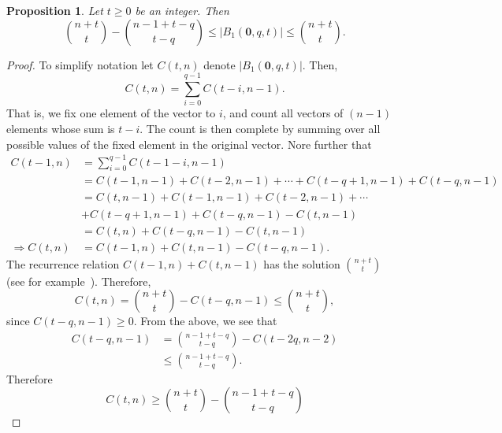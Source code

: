 \documentclass[pdflatex,sn-mathphys-num]{sn-jnl}
\newtheorem{proposition}{Proposition}
\theoremstyle{definition}
\newcommand{\vtr}[1]{\mathbf{#1}}
\begin{document}
\begin{proposition}
\label{prop:ball-cardinality}
Let $t \geq 0$ be an integer. Then
 \[
\binom{n + t}{t} - \binom{n -1 + t - q}{t-q} \leq |B_1(\vtr{0}, q, t)| \leq \binom{n + t}{t}.
 \]
\end{proposition}
\begin{proof}
To simplify notation let $C(t, n)$ denote $|B_1(\vtr{0}, q, t)|$. Then,
\[
C(t, n) = \sum_{i = 0}^{q-1} C(t - i, n - 1).
\]
That is, we fix one element of the vector to $i$, and count all vectors of $(n-1)$ elements whose sum is $t-i$. The count is then complete by summing over all possible values of the fixed element in the original vector. Nore further that 
\begin{align*}
    C(t-1, n) &= \sum_{i = 0}^{q-1} C(t -1 - i, n - 1)\\
    &= C(t-1, n - 1) + C(t-2, n - 1) + \cdots  + C(t-q+1, n - 1) + C(t-q, n - 1) \\
    &= C(t, n - 1) + C(t-1, n - 1) + C(t-2, n - 1) + \cdots \\
    &+ C(t-q+1, n - 1)  + C(t-q, n - 1) - C(t, n - 1)\\
    &= C(t, n) + C(t-q, n - 1) - C(t, n - 1) \\
\Rightarrow C(t, n) &= C(t-1, n) + C(t, n-1) - C(t-q, n-1).
\end{align*}
The recurrence relation $C(t-1, n) + C(t, n-1)$ has the solution $\binom{n + t}{t}$ (see for example~\cite[\S C]{asghar2014algebraic}). Therefore, 
\[
C(t, n) = \binom{n + t}{t} - C(t-q, n-1) \leq \binom{n + t}{t},
\]
since $C(t-q, n-1) \geq 0$.
From the above, we see that
\begin{align*}
       C(t-q, n-1) &=  \binom{n -1 + t - q}{t-q} - C(t-2q, n - 2) \\
       &\leq \binom{n -1 + t - q}{t-q}.
\end{align*}
Therefore
\[
C(t, n) \geq \binom{n + t}{t} - \binom{n -1 + t - q}{t-q}
\]
\end{proof}
\end{document}

